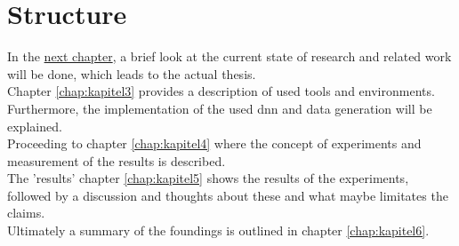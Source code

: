 	
	
	\section{Structure}
	\label{sec:structure}
		In the \hyperref[chap:kapitel2]{next chapter}, a brief look at the current state of research and related work will be done, which leads to the actual thesis.\\
		Chapter \ref{chap:kapitel3} provides a description of used tools and environments. Furthermore, the implementation of the used \ac{dnn} and data generation will be explained.\\
		Proceeding to chapter \ref{chap:kapitel4} where the concept of experiments and measurement of the results is described.\\
		The 'results' chapter \ref{chap:kapitel5} shows the results of the experiments, followed by a discussion and thoughts about these and what maybe limitates the claims.\\
		Ultimately a summary of the foundings is outlined in chapter \ref{chap:kapitel6}.
		





